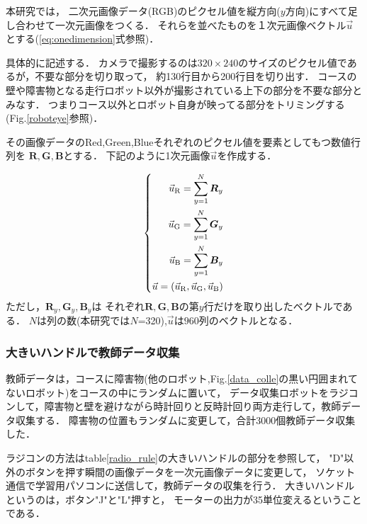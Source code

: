 本研究では，
二次元画像データ(RGB)のピクセル値を縦方向($y$方向)にすべて足し合わせて一次元画像をつくる．
それらを並べたものを１次元画像ベクトル$\vec{u}$とする(\ref{eq:onedimension}式参照)．

具体的に記述する．
カメラで撮影するのは$320 \times 240$のサイズのピクセル値であるが，不要な部分を切り取って，
約130行目から200行目を切り出す．
コースの壁や障害物となる走行ロボット以外が撮影されている上下の部分を不要な部分とみなす．
つまりコース以外とロボット自身が映ってる部分をトリミングする(Fig.\ref{roboteye}参照)．


その画像データのRed,Green,Blueそれぞれのピクセル値を要素としてもつ数値行列を
$\boldsymbol R,\boldsymbol G,\boldsymbol B$とする．
下記のように1次元画像$\vec{u}$を作成する．

\vspace{-2mm}
\begin{eqnarray}
\left\{
\begin{aligned}
\vec u_{\rm R}= \sum_{y=1}^N \boldsymbol R_{y}\\
\vec u_{\rm G}= \sum_{y=1}^N \boldsymbol G_{y}\\
\vec u_{\rm B}= \sum_{y=1}^N \boldsymbol B_{y}\\
\vec u = (\vec u_{\rm R}, \vec u_{\rm G}, \vec u_{\rm B}) \\
\end{aligned}
\right.
\label{eq:onedimension}
\end{eqnarray}
ただし，$\boldsymbol R_y, \boldsymbol G_y, \boldsymbol B_y$は
それぞれ$\boldsymbol R, \boldsymbol G, \boldsymbol B$の第$y$行だけを取り出したベクトルである．
$N$は列の数(本研究では$N$=320),$\vec u$は$960$列のベクトルとなる．


\subsubsection{大きいハンドルで教師データ収集}
教師データは，コースに障害物(他のロボット,Fig.\ref{data_colle}の黒い円囲まれてないロボット)をコースの中にランダムに置いて，
データ収集ロボットをラジコンして，障害物と壁を避けながら時計回りと反時計回り両方走行して，教師データ収集する．
障害物の位置もランダムに変更して，合計3000個教師データ収集した．

ラジコンの方法はtable\ref{radio_rule}の大きいハンドルの部分を参照して，
"D"以外のボタンを押す瞬間の画像データを一次元画像データに変更して，
ソケット通信で学習用パソコンに送信して，教師データの収集を行う．
大きいハンドルというのは，ボタン"J"と"L"押すと，
モーターの出力が35単位変えるということである．
